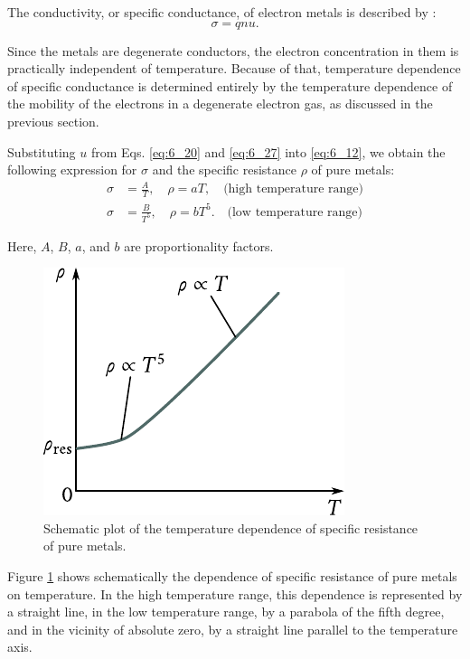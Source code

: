 The conductivity, or specific conductance, of electron metals is described by :
\begin{equation*}
	\sigma = qnu.
\end{equation*}

\noindent
Since the metals are degenerate conductors, the electron concentration in them is practically independent of temperature. Because of that, temperature dependence of specific conductance is determined entirely by the temperature dependence of the mobility of the electrons in a degenerate electron gas, as discussed in the previous section.

Substituting $u$ from Eqs. \eqref{eq:6_20} and \eqref{eq:6_27} into \eqref{eq:6_12}, we obtain the
following expression for $\sigma$ and the specific resistance $\rho$ of pure metals:
\begin{align}
	\sigma &= \frac{A}{T},\quad \rho = a T,\quad \text{(high temperature range)}\label{eq:6_28}\\
	\sigma &= \frac{B}{T^5},\quad \rho = b T^5.\quad \text{(low temperature range)}\label{eq:6_29}
\end{align}

\noindent
Here, $A$, $B$, $a$, and $b$ are proportionality factors.

\begin{figure}[t]
	\begin{center}
		\includegraphics[scale=1]{figures/ch_06/fig_6_10.pdf}
		\caption[]{Schematic plot of the temperature dependence of specific resistance of pure metals.}
		\label{fig:6_10}
	\end{center}
	\vspace{-0.7cm}
\end{figure}

Figure \ref{fig:6_10} shows schematically the dependence of specific resistance of pure metals on temperature. In the high temperature range, this dependence is represented by a straight line, in the low temperature range, by a parabola of the fifth degree, and in the vicinity of absolute zero, by a straight line parallel to the temperature axis.


